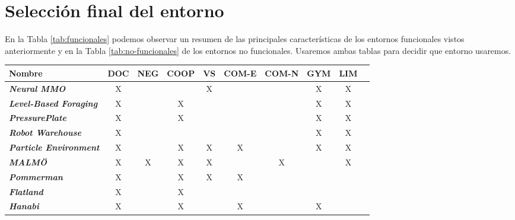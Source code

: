 \section{Selección final del entorno}
En la Tabla \ref{tab:funcionales} podemos observar un resumen de las principales características de los entornos funcionales vistos anteriormente y en la Tabla \ref{tab:no-funcionales} de los entornos no funcionales. Usaremos ambas tablas para decidir que entorno usaremos.
\begin{table}[ht]
	\begin{center}
		\begin{tabular}{| l | c | c | c | c | c | c | c | c | c |}
			\hline
			\textbf{Nombre}               & \textbf{DOC} & \textbf{NEG} & \textbf{COOP} & \textbf{VS} & \textbf{COM-E} & \textbf{COM-N} & \textbf{GYM} & \textbf{LIM} \\ \hline
			\textbf{\textit{Neural MMO}}           & X            &              &               & X           &                &                & X            & X            \\
			\textbf{\textit{Level-Based Foraging}} & X            &              & X             &             &                &                & X            & X            \\
			\textbf{\textit{PressurePlate}}        & X            &              & X             &             &                &                & X            & X            \\
			\textbf{\textit{Robot Warehouse}}      & X            &              &               &             &                &                & X            & X            \\
			\textbf{\textit{Particle Environment}} & X            &              & X             & X           & X              &                & X            & X            \\
			\textbf{\textit{MALMÖ}}                & X            & X            & X             & X           &               &  X             &             & X            \\
			\textbf{\textit{Pommerman}}            & X            &              & X             & X           & X              &                &             &              \\
			\textbf{\textit{Flatland}}             & X            &              & X             &             &                &                &              &              \\
			\textbf{\textit{Hanabi}}               & X            &              & X             &             & X              &                & X            &              \\

\end{tabular}
\end{center}
\end{table}
